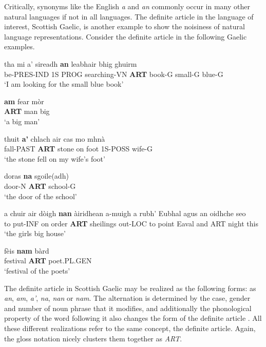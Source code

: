 \documentclass[final]{ua-thesis}
\numberwithin{equation}{section}
\begin{document}
Critically, synonyms like the English \textit{a} and \textit{an} commonly occur in many other natural languages if not in all languages. The definite article in the language of interest, Scottish Gaelic, is another example to show the noisiness of natural language representations. Consider the definite article in the following Gaelic examples. 

\begin{exe}  
\ex 
\gll tha mi a' sireadh \textbf{an} leabhair bhig ghuirm\\
be-PRES-IND 1S PROG searching-VN \textbf{ART} book-G small-G blue-G\\
\glt `I am looking for the small blue book' \citep[p. 29]{lamb2001scottish}

\ex 
\gll \textbf{am} fear m\`or\\
\textbf{ART} man big\\
\glt `a big man' \citep[p. 31]{lamb2001scottish}

\ex
\gll thuit \textbf{a'} chlach air cas mo mhn\`a\\
fall-PAST \textbf{ART} stone on foot 1S-POSS wife-G\\
\glt`the stone fell on my wife's foot' \citep[p. 30]{lamb2001scottish} 	

\ex
\gll doras \textbf{na} sgoile(adh) \\
door-N \textbf{ART} school-G \\
\glt `the door of the school' \citep[p. 29]{lamb2001scottish} 	

\ex 
\gll a chuir air d\`oigh \textbf{nan} \`airidhean a-muigh a rubh' Eubhal agus an oidhche seo \\
to put-INF on order \textbf{ART} sheilings out-LOC to point Eaval and ART night this \\
\glt `the girls big house' \citep[p. 100]{lamb2001scottish} 

\ex
\gll f\`eis \textbf{nam} b\`ard\\
festival \textbf{ART} poet.PL.GEN\\
\glt `festival of the poets' \citep[p. 107]{lamb2001scottish}

\end{exe}

The definite article in Scottish Gaelic may be realized as the following forms: as \textit{an}, \textit{am}, \textit{a'}, \textit{na}, \textit{nan} or \textit{nam}. The alternation is determined by the case, gender and number of noun phrase that it modifies, and additionally the phonological property of the word following it also changes the form of the definite article \citep{lamb2001scottish}. All these different realizations refer to the same concept, the definite article. Again, the gloss notation nicely clusters them together as \textit{ART}.
\end{document}
